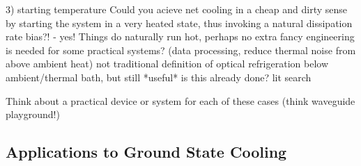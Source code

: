 3) starting temperature
     Could you acieve net cooling in a cheap and dirty sense by starting the system in a very heated state, thus invoking a natural dissipation rate bias?! - yes!
     Things do naturally run hot, perhaps no extra fancy engineering is needed for some practical systems? (data processing, reduce thermal noise from above ambient heat)
     not traditional definition of optical refrigeration below ambient/thermal bath, but still *useful*
     is this already done? lit search

Think about a practical device or system for each of these cases (think waveguide playground!)

\subsection{Applications to Ground State Cooling}
\label{Cooling:subsec:ApplicationstoGroundStateCooling}
